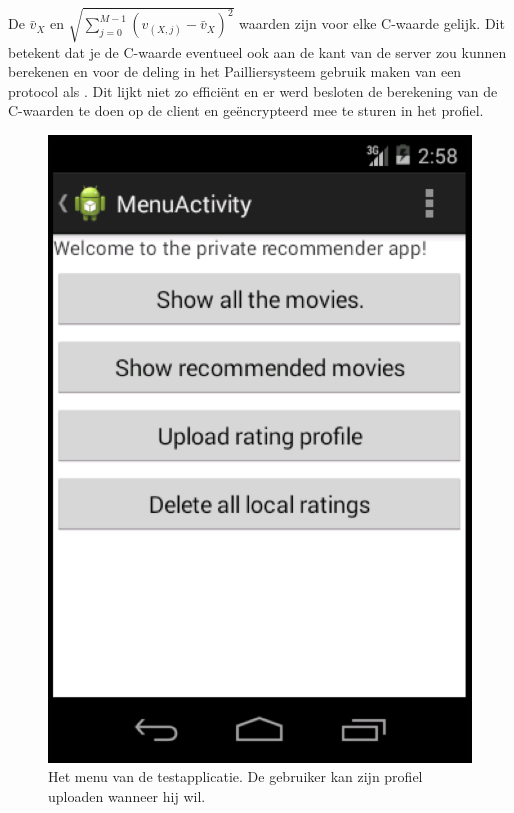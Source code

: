 De  $\bar{v}_X$ en $\sqrt{\sum_{j=0}^{M-1} (v_{(X,j)} - \bar{v}_X)^2}$ waarden zijn voor elke C-waarde gelijk. Dit betekent dat je de C-waarde eventueel ook aan de kant van de server zou kunnen berekenen en voor de deling in het Pailliersysteem gebruik maken van een protocol als \cite{VeugenEID}. Dit lijkt niet zo effici\"ent en er werd besloten de berekening van de C-waarden te doen op de client en ge\"encrypteerd mee te sturen in het profiel.
\begin{figure}[htpb]   
    \label{Figuur::upload_profile}      
  \begin{center}    
 \includegraphics[scale=0.5]{fig/upload_profile}    
  \end{center}   
  \caption{Het menu van de testapplicatie. De gebruiker kan zijn profiel uploaden wanneer hij wil.}  
   \end{figure}
